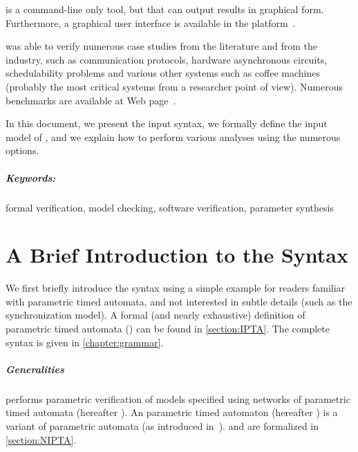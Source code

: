 \imitator{} is a command-line only tool, but that can output results in graphical form.
Furthermore, a graphical user interface is available in the \CosyVerif{} platform~\cite{AHHKLLP13}.

\imitator{} was able to verify numerous case studies from the literature and from the industry, such as communication protocols, hardware asynchronous circuits, schedulability problems and various other systems such as coffee machines (probably the most critical systems from a researcher point of view).
Numerous benchmarks are available at \imitator{} Web page~\cite{imitator}.

In this document, we present the input syntax, we formally define the input model of \imitator{}, and we explain how to perform various analyses using the numerous options.


\paragraph{Keywords:} formal verification, model checking, software verification, parameter synthesis


\chapter{A Brief Introduction to the Syntax}

We first briefly introduce the syntax using a simple example for readers familiar with parametric timed automata, and not interested in subtle details (such as the synchronization model).
A formal (and nearly exhaustive) definition of \imitator{} parametric timed automata (\NIPTA{}) can be found in \cref{section:IPTA}.
The complete syntax is given in \cref{chapter:grammar}.

\paragraph{Generalities}
\imitator{} performs parametric verification of models specified using networks of \imitator{} parametric timed automata (hereafter \NIPTA{}).
An \imitator{} parametric timed automaton (hereafter \IPTA{}) is a variant of parametric automata (as introduced in~\cite{AHV93}).
\IPTA{} and \NIPTA{} are formalized in \cref{section:NIPTA}.

